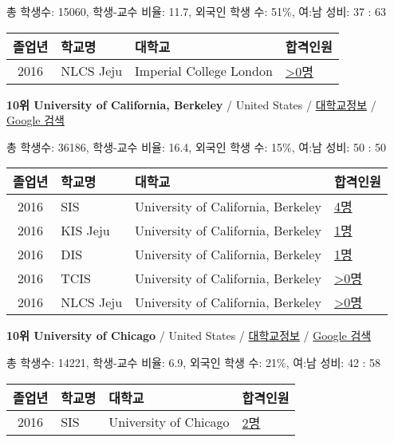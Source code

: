 \documentclass[13pt,]{article}
\begin{document}
총 학생수: 15060, 학생-교수 비율: 11.7, 외국인 학생 수: 51\%, 여:남
성비: 37 : 63

\begin{longtable}[]{@{}clll@{}}
\toprule
졸업년 & 학교명 & 대학교 & 합격인원\tabularnewline
\midrule
\endhead
2016 & NLCS Jeju & Imperial College London &
\href{http://cafe.naver.com/assarabia/11592}{\textgreater{}0명}\tabularnewline
\bottomrule
\end{longtable}

\textbf{10위 University of California, Berkeley} / United States /
\href{https://www.timeshighereducation.com/world-university-rankings/university-of-california-berkeley?ranking-dataset=589595}{대학교정보}
/
\href{http://www.google.com/search?q=University+of+California,+Berkeley}{Google
검색}

총 학생수: 36186, 학생-교수 비율: 16.4, 외국인 학생 수: 15\%, 여:남
성비: 50 : 50

\begin{longtable}[]{@{}clll@{}}
\toprule
졸업년 & 학교명 & 대학교 & 합격인원\tabularnewline
\midrule
\endhead
2016 & SIS & University of California, Berkeley &
\href{http://cafe.naver.com/assarabia/11589}{4명}\tabularnewline
2016 & KIS Jeju & University of California, Berkeley &
\href{http://cafe.naver.com/assarabia/11596}{1명}\tabularnewline
2016 & DIS & University of California, Berkeley &
\href{http://cafe.naver.com/assarabia/11591}{1명}\tabularnewline
2016 & TCIS & University of California, Berkeley &
\href{http://cafe.naver.com/assarabia/11598}{\textgreater{}0명}\tabularnewline
2016 & NLCS Jeju & University of California, Berkeley &
\href{http://cafe.naver.com/assarabia/11592}{\textgreater{}0명}\tabularnewline
\bottomrule
\end{longtable}

\textbf{10위 University of Chicago} / United States /
\href{https://www.timeshighereducation.com/world-university-rankings/university-of-chicago?ranking-dataset=589595}{대학교정보}
/ \href{http://www.google.com/search?q=University+of+Chicago}{Google
검색}

총 학생수: 14221, 학생-교수 비율: 6.9, 외국인 학생 수: 21\%, 여:남 성비:
42 : 58

\begin{longtable}[]{@{}clll@{}}
\toprule
졸업년 & 학교명 & 대학교 & 합격인원\tabularnewline
\midrule
\endhead
2016 & SIS & University of Chicago &
\href{http://cafe.naver.com/assarabia/11589}{2명}\tabularnewline
\bottomrule
\end{longtable}
\end{document}
